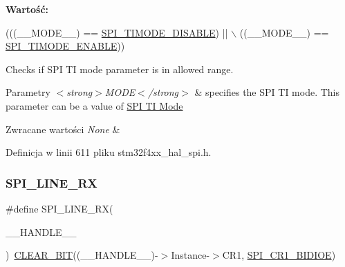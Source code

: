 {\bfseries Wartość\+:}
\begin{DoxyCode}
(((\_\_MODE\_\_) == \hyperlink{group___s_p_i___t_i__mode_gaffbf066ee656a4d56b75fa721a2eabcd}{SPI\_TIMODE\_DISABLE}) || \(\backslash\)
                                 ((\_\_MODE\_\_) == \hyperlink{group___s_p_i___t_i__mode_ga8b31d4b25f951edd1dfd7cf6d4387517}{SPI\_TIMODE\_ENABLE}))
\end{DoxyCode}


Checks if S\+PI TI mode parameter is in allowed range. 


\begin{DoxyParams}{Parametry}
{\em $<$strong$>$\+M\+O\+D\+E$<$/strong$>$} & specifies the S\+PI TI mode. This parameter can be a value of \hyperlink{group___s_p_i___t_i__mode}{S\+PI TI Mode} \\
\hline
\end{DoxyParams}

\begin{DoxyRetVals}{Zwracane wartości}
{\em None} & \\
\hline
\end{DoxyRetVals}


Definicja w linii 611 pliku stm32f4xx\+\_\+hal\+\_\+spi.\+h.

\mbox{\label{group___s_p_i___private___macros_gaa8d58cef91c1874d5a4dde4014cf6269}} 
\subsubsection{\texorpdfstring{S\+P\+I\+\_\+L\+I\+N\+E\+\_\+\+RX}{SPI\_1LINE\_RX}}
{\footnotesize\ttfamily \#define S\+P\+I\+\_\+L\+I\+N\+E\+\_\+\+RX(\begin{DoxyParamCaption}\item[{}]{\+\_\+\+\_\+\+H\+A\+N\+D\+L\+E\+\_\+\+\_\+ }\end{DoxyParamCaption})~\hyperlink{group___exported__macro_ga133aae6fc0d41bffab39ab223a7001de}{C\+L\+E\+A\+R\+\_\+\+B\+IT}((\+\_\+\+\_\+\+H\+A\+N\+D\+L\+E\+\_\+\+\_\+)-\/$>$Instance-\/$>$C\+R1, \hyperlink{group___peripheral___registers___bits___definition_ga378953916b7701bd49f063c0366b703f}{S\+P\+I\+\_\+\+C\+R1\+\_\+\+B\+I\+D\+I\+OE})}



